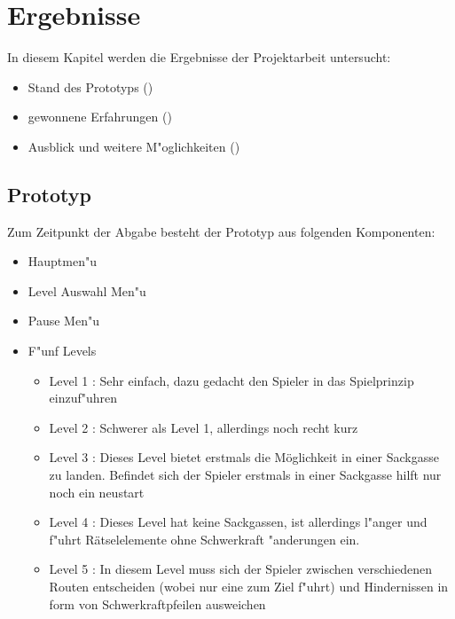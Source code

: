 \section{Ergebnisse}
\label{sec:results}
%
In diesem Kapitel werden die Ergebnisse der Projektarbeit untersucht:
\begin{itemize}
	\item
		Stand des Prototyps ()
	\item
		gewonnene Erfahrungen ()
	\item
		Ausblick und weitere M"oglichkeiten ()
\end{itemize}
%
\subsection{Prototyp}
\label{sec:results/prototype}
%
Zum Zeitpunkt der Abgabe besteht der Prototyp aus folgenden Komponenten:
\begin{itemize}
	\item Hauptmen"u
	\item Level Auswahl Men"u
	\item Pause Men"u
	\item F"unf Levels
	\begin{itemize}
		\item Level 1 : Sehr einfach, dazu gedacht den Spieler in das Spielprinzip einzuf"uhren
		\item Level 2 : Schwerer als Level 1, allerdings noch recht kurz
		\item Level 3 : Dieses Level bietet erstmals die Möglichkeit in einer Sackgasse zu landen. Befindet sich der Spieler erstmals in einer Sackgasse 
										hilft nur noch ein neustart
		\item Level 4 : Dieses Level hat keine Sackgassen, ist allerdings l"anger und f"uhrt Rätselelemente ohne Schwerkraft "anderungen ein.
		\item Level 5 : In diesem Level muss sich der Spieler zwischen verschiedenen Routen entscheiden (wobei nur eine zum Ziel f"uhrt) und 
										Hindernissen in form von Schwerkraftpfeilen ausweichen
	\end{itemize}
\end{itemize}

